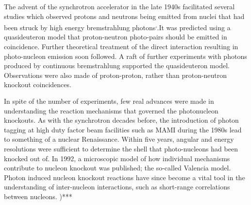 \documentclass[a4paper,12pt]{article}
\begin{document}
The advent of the synchrotron accelerator in the late 1940s facilitated several studies which observed protons and neutrons being emitted from nuclei that had been struck by high energy bremstrahlung photons\cite{perlman}\textsuperscript{,}\cite{levinthal}{}.It was predicted using a quasideuteron model that proton-neutron photo-pairs should be emitted in coincidence\cite{Levinger}{}. Further theoretical treatment of the direct interaction resulting in photo-nucleon emission soon followed\cite{gottfried}{}. A raft of further experiments with photons produced by continuous bremstrahlung supported the quasideuteron model\cite{smith}{}. Observations were also made of proton-proton, rather than proton-neutron knockout coincidences\cite{weinstein}{}.

In spite of the number of experiments, few real advances were made in understanding the reaction mechanisms that governed the photonucleon knockouts. As with the synchrotron decades before, the introduction of photon tagging at high duty factor beam facilities such as MAMI during the 1980s\cite{anthony} lead to something of a nuclear Renaissance. Within five years, angular and energy resolutions were sufficient to determine the shell that photo-nucleons had been knocked out of\cite{dancer}{}. In 1992, a microscopic model of how individual mechanisms contribute to nucleon knockout was published; the so-called Valencia model\cite{valencia}{}. Photon induced nucleon knockout reactions have since become a vital tool in the understanding of inter-nucleon interactions, such as short-range correlations between nucleons\cite{giusti}{}.
)***
\end{document}
